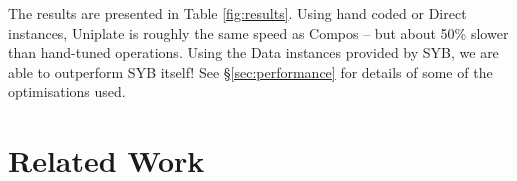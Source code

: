 \documentclass[preprint]{sigplanconf}
\begin{document}

The results are presented in Table \ref{fig:results}. Using hand coded or Direct instances, Uniplate is roughly the same speed as Compos -- but about 50\% slower than hand-tuned operations. Using the Data instances provided by SYB, we are able to outperform SYB itself! See \S\ref{sec:performance} for details of some of the optimisations used.


\section{Related Work}
\label{sec:related}
\end{document}

